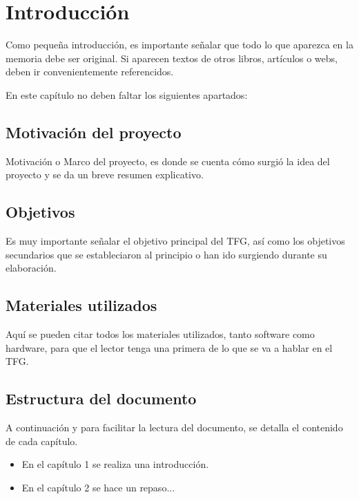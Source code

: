 \chapter{Introducción}

Como pequeña introducción, es importante señalar que todo lo que aparezca en la memoria debe ser original. Si aparecen textos de otros libros, artículos o webs, deben ir convenientemente referencidos.

En este capítulo no deben faltar los siguientes apartados:

\section{Motivación del proyecto}

Motivación o Marco del proyecto, es donde se cuenta cómo surgió la idea del proyecto y se da un breve resumen explicativo.

\section{Objetivos}

Es muy importante señalar el objetivo principal del TFG, así como los objetivos secundarios que se estableciaron al principio o han ido surgiendo durante su elaboración.

\section{Materiales utilizados}

Aquí se pueden citar todos los materiales utilizados, tanto software como hardware, para que el lector tenga una primera de lo que se va a hablar en el TFG.

\section{Estructura del documento}

A continuación y para facilitar la lectura del documento, se detalla el contenido de cada capítulo.

\begin{itemize}
\item En el capítulo 1 se realiza una introducción.
\item En el capítulo 2 se hace un repaso...
\end{itemize}
